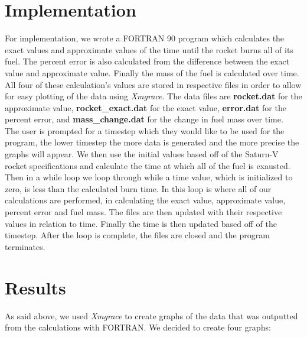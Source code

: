 \documentclass[11pt]{article}
\begin{document}
\section{Implementation}
For implementation, we wrote a FORTRAN 90 program which calculates the exact values and approximate values of the time until the rocket burns all of its fuel. The percent error is also calculated from the difference between the exact value and approximate value. Finally the mass of the fuel is calculated over time. All four of these calculation's values are stored in respective files in order to allow for easy plotting of the data using \textit{Xmgrace}. The data files are \textbf{rocket.dat} for the approximate value, \textbf{rocket\_exact.dat} for the exact value, \textbf{error.dat} for the percent error, and \textbf{mass\_change.dat} for the change in fuel mass over time.\\

The user is prompted for a timestep which they would like to be used for the program, the lower timestep the more data is generated and the more precise the graphs will appear. We then use the initial values based off of the Saturn-V rocket specifications and calculate the time at which all of the fuel is exausted. Then in a while loop we loop through while a time value, which is initialized to zero, is less than the calculated burn time. In this loop is where all of our calculations are performed, in calculating the exact value, approximate value, percent error and fuel mass. The files are then updated with their respective values in relation to time. Finally the time is then updated based off of the timestep. After the loop is complete, the files are closed and the program terminates.

\section{Results}
As said above, we used \textit{Xmgrace} to create graphs of the data that was outputted from the calculations with FORTRAN. We decided to create four graphs:

\vspace{0.25cm}
\end{document}
